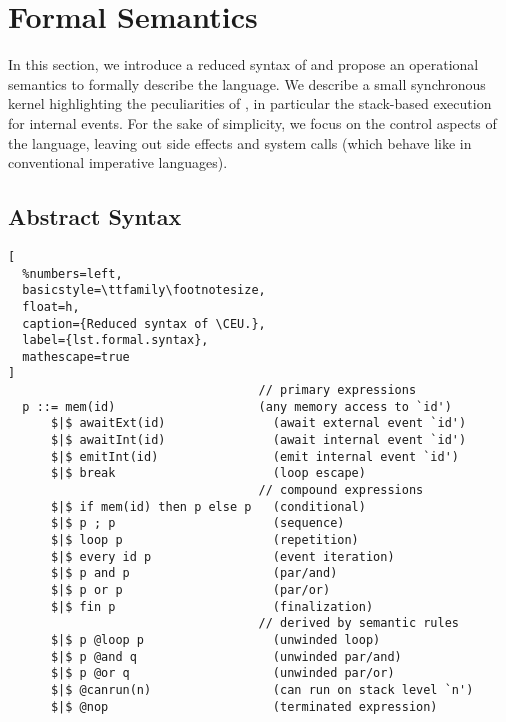 \newcommand{\NST}{\1\xrightarrow[nst]\1}
\newcommand{\OUT}{\1\xrightarrow[out]\1}
\newcommand{\LL}{\langle}
\newcommand{\RR}{\rangle}
\newcommand{\DS}{\displaystyle}

\newcommand{\1}{\;}
\newcommand{\2}{\;\;}
\newcommand{\3}{\;\;\;}
\newcommand{\5}{\;\;\;\;\;}

\section{Formal Semantics}
\label{sec.sem}

%

In this section, we introduce a reduced syntax of \CEU and propose an 
operational semantics to formally describe the language.
We describe a small synchronous kernel highlighting the peculiarities of \CEU, 
in particular the stack-based execution for internal events.
%
For the sake of simplicity, we focus on the control aspects of the language, 
leaving out side effects and system calls (which behave like in conventional 
imperative languages).

\subsection{Abstract Syntax}
\label{sec.sem.syntax}

\begin{lstlisting}[
  %numbers=left,
  basicstyle=\ttfamily\footnotesize,
  float=h,
  caption={Reduced syntax of \CEU.},
  label={lst.formal.syntax},
  mathescape=true
]
                                   // primary expressions
  p ::= mem(id)                    (any memory access to `id')
      $|$ awaitExt(id)               (await external event `id')
      $|$ awaitInt(id)               (await internal event `id')
      $|$ emitInt(id)                (emit internal event `id')
      $|$ break                      (loop escape)
                                   // compound expressions
      $|$ if mem(id) then p else p   (conditional)
      $|$ p ; p                      (sequence)
      $|$ loop p                     (repetition)
      $|$ every id p                 (event iteration)
      $|$ p and p                    (par/and)
      $|$ p or p                     (par/or)
      $|$ fin p                      (finalization)
                                   // derived by semantic rules
      $|$ p @loop p                  (unwinded loop)
      $|$ p @and q                   (unwinded par/and)
      $|$ p @or q                    (unwinded par/or)
      $|$ @canrun(n)                 (can run on stack level `n')
      $|$ @nop                       (terminated expression)
\end{lstlisting}


